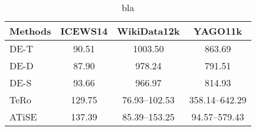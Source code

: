 

\begin{table}[htb]
    \centering
    \begin{minipage}{0.95\columnwidth}
    \centering
    \caption{bla}
    \vspace{-3mm}
    
    \begin{tabular}{lccc}
    \hline
    Methods & ICEWS14 & WikiData12k & YAGO11k\\
    \hline
    DE-T & 90.51 & 1003.50 & 863.69\\
    DE-D & 87.90 & 978.24 & 791.51\\
    DE-S & 93.66 & 966.97 & 814.93\\
    TeRo & 129.75 & 76.93–102.53 & 358.14–642.29\\
    ATiSE & 137.39 & 85.39–153.25 & 94.57–579.43\\
    \hline
    \end{tabular} 
    
    \label{tab:temporal_precision_experiment}
    \end{minipage}
\end{table}